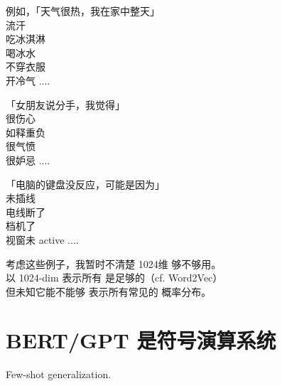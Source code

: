 例如，「天气很热，我在家中整天\underline{\hspace*{2cm}}」\\
	\tab \textbullet 流汗 \\
	\tab \textbullet 吃冰淇淋 \\
	\tab \textbullet 喝冰水 \\
	\tab \textbullet 不穿衣服 \\
	\tab \textbullet 开冷气 ....

「女朋友说分手，我觉得\underline{\hspace*{2cm}}」\\
\tab \textbullet 很伤心 \\
\tab \textbullet 如释重负 \\
\tab \textbullet 很气愤 \\
\tab \textbullet 很妒忌 ....

「电脑的键盘没反应，可能是因为\underline{\hspace*{2cm}}」\\
\tab \textbullet 未插线 \\
\tab \textbullet 电线断了 \\
\tab \textbullet 档机了 \\
\tab \textbullet 视窗未 active ....

考虑这些例子，我暂时不清楚 1024维 够不够用。 \\
以 1024-dim 表示所有  是足够的（cf. Word2Vec） \\
但未知它能不能够 表示所有常见的  概率分布。

\begin{comment}
\newcommand{\ttt}{$\blacktriangleright$}
那怎么解决呢？ \\
有个方法是 将所有概念 按照「本体论」\emp{ontology} 分类， \\
例如： 物体\ttt 生物\ttt 人体\ttt 上肢\ttt 手臂\ttt 手\ttt 手指 \\
\let\ttt\undefined
然后 每次输出的是一个 sub-class 的 label， \\
分多次输出，\\
而且每次输出时，\\
上一个 sub-class label 也是输入的一部分。
\end{comment}

\section{BERT/GPT 是符号演算系统}

Few-shot generalization.

